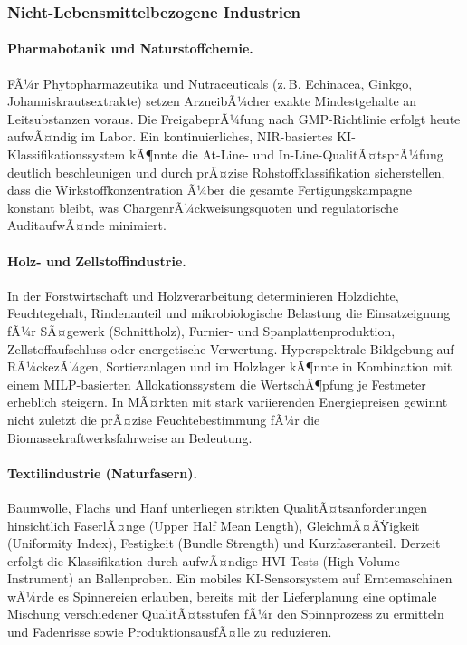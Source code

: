 ﻿\documentclass[12pt,a4paper]{article}
\theoremstyle{plain}
\theoremstyle{definition}
\begin{document}
	\subsubsection{Nicht-Lebensmittelbezogene Industrien}

	\paragraph{Pharmabotanik und Naturstoffchemie.}
	FÃ¼r Phytopharmazeutika und Nutraceuticals (z.\,B. Echinacea,
	Ginkgo, Johanniskrautsextrakte) setzen ArzneibÃ¼cher exakte Mindestgehalte
	an Leitsubstanzen voraus. Die FreigabeprÃ¼fung nach GMP-Richtlinie erfolgt
	heute aufwÃ¤ndig im Labor. Ein kontinuierliches, NIR-basiertes
	KI-Klassifikationssystem kÃ¶nnte die At-Line- und In-Line-QualitÃ¤tsprÃ¼fung
	deutlich beschleunigen und durch prÃ¤zise Rohstoffklassifikation
	sicherstellen, dass die Wirkstoffkonzentration Ã¼ber die gesamte
	Fertigungskampagne konstant bleibt, was ChargenrÃ¼ckweisungsquoten und
	regulatorische AuditaufwÃ¤nde minimiert.

	\paragraph{Holz- und Zellstoffindustrie.}
	In der Forstwirtschaft und Holzverarbeitung determinieren Holzdichte,
	Feuchtegehalt, Rindenanteil und mikrobiologische Belastung die
	Einsatzeignung fÃ¼r SÃ¤gewerk (Schnittholz), Furnier- und
	Spanplattenproduktion, Zellstoffaufschluss oder energetische Verwertung.
	Hyperspektrale Bildgebung auf RÃ¼ckezÃ¼gen, Sortieranlagen und im
	Holzlager kÃ¶nnte in Kombination mit einem MILP-basierten
	Allokationssystem die WertschÃ¶pfung je Festmeter erheblich steigern.
	In MÃ¤rkten mit stark variierenden Energiepreisen gewinnt nicht zuletzt
	die prÃ¤zise Feuchtebestimmung fÃ¼r die Biomassekraftwerksfahrweise an Bedeutung.

	\paragraph{Textilindustrie (Naturfasern).}
	Baumwolle, Flachs und Hanf unterliegen strikten QualitÃ¤tsanforderungen
	hinsichtlich FaserlÃ¤nge (Upper Half Mean Length), GleichmÃ¤ÃŸigkeit
	(Uniformity Index), Festigkeit (Bundle Strength) und Kurzfaseranteil.
	Derzeit erfolgt die Klassifikation durch aufwÃ¤ndige HVI-Tests (High
	Volume Instrument) an Ballenproben. Ein mobiles KI-Sensorsystem auf
	Erntemaschinen wÃ¼rde es Spinnereien erlauben, bereits mit der
	Lieferplanung eine optimale Mischung verschiedener QualitÃ¤tsstufen
	fÃ¼r den Spinnprozess zu ermitteln und Fadenrisse sowie ProduktionsausfÃ¤lle
	zu reduzieren.
\end{document}
